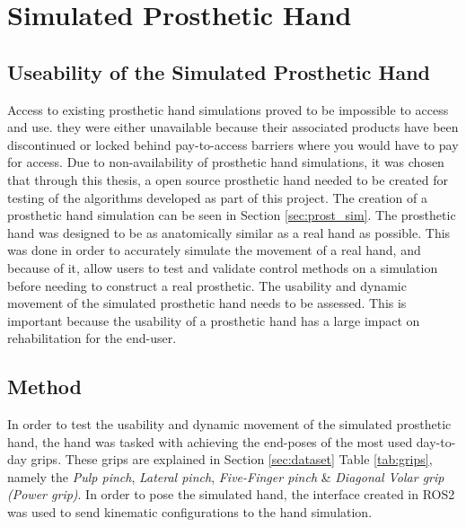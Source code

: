 \documentclass[../main.tex]{subfiles}
\begin{document}

\newpage
\section{Simulated Prosthetic Hand}
\label{sec:simtest}

\subsection{Useability of the Simulated Prosthetic Hand}

Access to existing prosthetic hand simulations proved to be impossible to access and use.
they were either unavailable because their associated products have been discontinued or locked behind pay-to-access barriers where you would have to pay for access.
Due to non-availability of prosthetic hand simulations, it was chosen that through this thesis, a open source prosthetic hand needed to be created for testing of the algorithms developed as part of this project.
The creation of a prosthetic hand simulation can be seen in Section \ref{sec:prost_sim}.
The prosthetic hand was designed to be as anatomically similar as a real hand as possible.
This was done in order to accurately simulate the movement of a real hand, and because of it, allow users to test and validate control methods on a simulation before needing to construct a real prosthetic.
The usability and dynamic movement of the simulated prosthetic hand needs to be assessed.
This is important because the usability of a prosthetic hand has a large impact on rehabilitation for the end-user.

\subsection{Method}

In order to test the usability and dynamic movement of the simulated prosthetic hand, the hand was tasked with achieving the end-poses of the most used day-to-day grips.
These grips are explained in Section \ref{sec:dataset} Table \ref{tab:grips}, namely the \textit{Pulp pinch}, \textit{Lateral pinch}, \textit{Five-Finger pinch} \& \textit{Diagonal Volar grip (Power grip)}.
In order to pose the simulated hand, the interface created in ROS2 was used to send kinematic configurations to the hand simulation.
\end{document}

